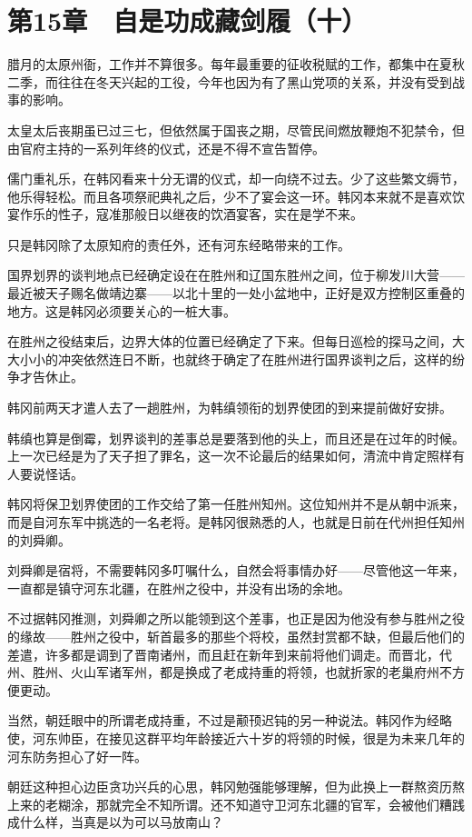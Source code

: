 \section{第15章　自是功成藏剑履（十）}

腊月的太原州衙，工作并不算很多。每年最重要的征收税赋的工作，都集中在夏秋二季，而往往在冬天兴起的工役，今年也因为有了黑山党项的关系，并没有受到战事的影响。

太皇太后丧期虽已过三七，但依然属于国丧之期，尽管民间燃放鞭炮不犯禁令，但由官府主持的一系列年终的仪式，还是不得不宣告暂停。

儒门重礼乐，在韩冈看来十分无谓的仪式，却一向绕不过去。少了这些繁文缛节，他乐得轻松。而且各项祭祀典礼之后，少不了宴会这一环。韩冈本来就不是喜欢饮宴作乐的性子，寇准那般日以继夜的饮酒宴客，实在是学不来。

只是韩冈除了太原知府的责任外，还有河东经略带来的工作。

国界划界的谈判地点已经确定设在在胜州和辽国东胜州之间，位于柳发川大营——最近被天子赐名做靖边寨——以北十里的一处小盆地中，正好是双方控制区重叠的地方。这是韩冈必须要关心的一桩大事。

在胜州之役结束后，边界大体的位置已经确定了下来。但每日巡检的探马之间，大大小小的冲突依然连日不断，也就终于确定了在胜州进行国界谈判之后，这样的纷争才告休止。

韩冈前两天才遣人去了一趟胜州，为韩缜领衔的划界使团的到来提前做好安排。

韩缜也算是倒霉，划界谈判的差事总是要落到他的头上，而且还是在过年的时候。上一次已经是为了天子担了罪名，这一次不论最后的结果如何，清流中肯定照样有人要说怪话。

韩冈将保卫划界使团的工作交给了第一任胜州知州。这位知州并不是从朝中派来，而是自河东军中挑选的一名老将。是韩冈很熟悉的人，也就是日前在代州担任知州的刘舜卿。

刘舜卿是宿将，不需要韩冈多叮嘱什么，自然会将事情办好——尽管他这一年来，一直都是镇守河东北疆，在胜州之役中，并没有出场的余地。

不过据韩冈推测，刘舜卿之所以能领到这个差事，也正是因为他没有参与胜州之役的缘故——胜州之役中，斩首最多的那些个将校，虽然封赏都不缺，但最后他们的差遣，许多都是调到了晋南诸州，而且赶在新年到来前将他们调走。而晋北，代州、胜州、火山军诸军州，都是换成了老成持重的将领，也就折家的老巢府州不方便更动。

当然，朝廷眼中的所谓老成持重，不过是颟顸迟钝的另一种说法。韩冈作为经略使，河东帅臣，在接见这群平均年龄接近六十岁的将领的时候，很是为未来几年的河东防务担心了好一阵。

朝廷这种担心边臣贪功兴兵的心思，韩冈勉强能够理解，但为此换上一群熬资历熬上来的老糊涂，那就完全不知所谓。还不知道守卫河东北疆的官军，会被他们糟践成什么样，当真是以为可以马放南山？

